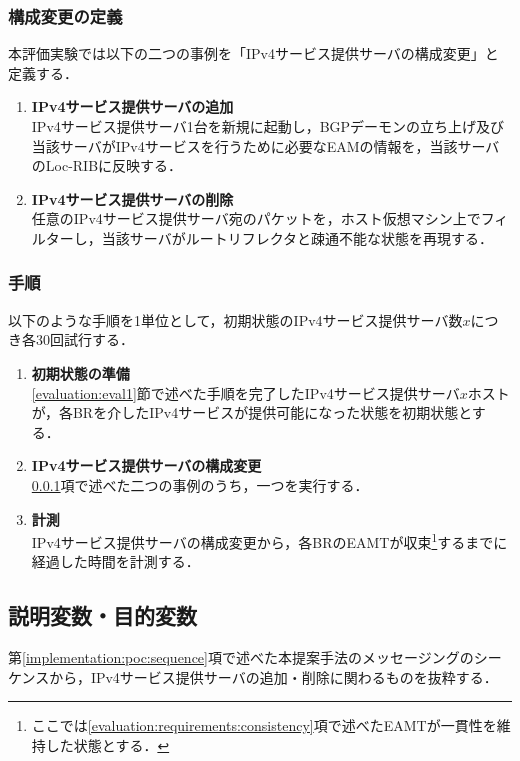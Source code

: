 \subsubsection{構成変更の定義}
\label{evaluation:eval2:scenario:definication}
本評価実験では以下の二つの事例を「IPv4サービス提供サーバの構成変更」と定義する．

\begin{enumerate}
    \item \textbf{IPv4サービス提供サーバの追加} \\
    IPv4サービス提供サーバ1台を新規に起動し，BGPデーモンの立ち上げ及び当該サーバがIPv4サービスを行うために必要なEAMの情報を，当該サーバのLoc-RIBに反映する． 
    \item \textbf{IPv4サービス提供サーバの削除} \\
    任意のIPv4サービス提供サーバ宛のパケットを，ホスト仮想マシン上でフィルターし，当該サーバがルートリフレクタと疎通不能な状態を再現する．
\end{enumerate}


\subsubsection{手順}
以下のような手順を1単位として，初期状態のIPv4サービス提供サーバ数$x$につき各30回試行する．
\begin{enumerate}
    \item \textbf{初期状態の準備} \\
    \ref{evaluation:eval1}節で述べた手順を完了したIPv4サービス提供サーバ$x$ホストが，各BRを介したIPv4サービスが提供可能になった状態を初期状態とする．
    \item \textbf{IPv4サービス提供サーバの構成変更} \\
    \ref{evaluation:eval2:scenario:definication}項で述べた二つの事例のうち，一つを実行する．
    \item \textbf{計測} \\
    IPv4サービス提供サーバの構成変更から，各BRのEAMTが収束\footnote{ここでは\ref{evaluation:requirements:consistency}項で述べたEAMTが一貫性を維持した状態とする．}するまでに経過した時間を計測する．
\end{enumerate}

\subsection{説明変数・目的変数}
\label{evaluation:eval2:scenario:vars}

第\ref{implementation:poc:sequence}項で述べた本提案手法のメッセージングのシーケンスから，IPv4サービス提供サーバの追加・削除に関わるものを抜粋する．

